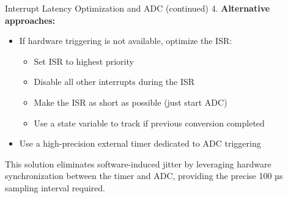 \begin{example2}{Interrupt Latency Optimization and ADC (continued)}
4. \textbf{Alternative approaches:}
   \begin{itemize}
     \item If hardware triggering is not available, optimize the ISR:
     \begin{itemize}
       \item Set ISR to highest priority
       \item Disable all other interrupts during the ISR
       \item Make the ISR as short as possible (just start ADC)
       \item Use a state variable to track if previous conversion completed
     \end{itemize}
     \item Use a high-precision external timer dedicated to ADC triggering
   \end{itemize}

This solution eliminates software-induced jitter by leveraging hardware synchronization between the timer and ADC, providing the precise 100 µs sampling interval required.
\end{example2}